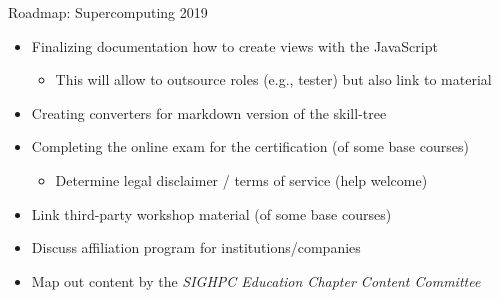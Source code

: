\documentclass[compress,aspectratio=169]{beamer}
\begin{document}
\begin{frame}{Roadmap: Supercomputing 2019}
		\begin{itemize}
			\item Finalizing documentation how to create views with the JavaScript
        \begin{itemize}
          \item This will allow to outsource roles (e.g., tester) but also link to material
        \end{itemize}
      \item Creating converters for markdown version of the skill-tree
			\item Completing the online exam for the certification (of some base courses)
				\begin{itemize}
					\item Determine legal disclaimer / terms of service (help welcome)
				\end{itemize}
      \item Link third-party workshop material (of some base courses)
			\item Discuss affiliation program for institutions/companies
			\item Map out content by the \textit{SIGHPC Education Chapter Content Committee}
		\end{itemize}
  \label{frame:last}
\end{frame}
\end{document}
